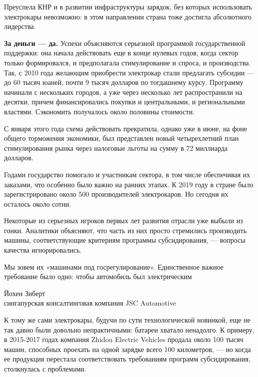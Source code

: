 Преуспела КНР и в развитии инфраструктуры зарядок, без которых использовать электрокары невозможно: в этом направлении страна тоже достигла абсолютного лидерства.

\textbf{За деньги --- да.} Успехи объясняются серьезной программой государственной поддержки: она начала действовать еще в конце нулевых годов, когда сектор только формировался, и предполагала стимулирование и спроса, и производства. Так, с 2010 года желающим приобрести электрокар стали предлагать субсидии — до 60 тысяч юаней, почти 9 тысяч долларов по тогдашнему курсу. Программу начинали с нескольких городов, а уже через несколько лет распространили на десятки, причем финансировались покупки и центральными, и региональными властями. Сэкономить получалось около половины стоимости.

С января этого года схема действовать прекратила, однако уже в июне, на фоне общего торможения экономики, был представлен новый четырехлетний план стимулирования рынка через налоговые льготы на сумму в 72 миллиарда долларов.

Годами государство помогало и участникам сектора, в том числе обеспечивая их заказами, что особенно было важно на ранних этапах. К 2019 году в стране было зарегистрировано около 500 производителей электрокаров. Но сегодня их осталось около сотни.

Некоторые из серьезных игроков первых лет развития отрасли уже выбыли из гонки. Аналитики объясняют, что часть из них просто стремились производить машины, соответствующие критериям программы субсидирования, — вопросы качества игнорировались.

\begin{fancyquotes}
    Мы зовем их «машинами под госрегулирование». Единственное важное требование было одно: чтобы автомобиль был электрическим\\

    \begin{flushright}
        Йохен Зиберт\\
        сингапурская консалтинговая компания JSC Automotive
    \end{flushright}
\end{fancyquotes}

К тому же сами электрокары, будучи по сути технологической новинкой, еще не так давно были довольно непрактичными: батареи хватало ненадолго. К примеру, в 2015-2017 годах компания Zhidou Electric Vehicles продала около 100 тысяч машин, способных проехать на одной зарядке всего 100 километров, — но когда ее продукция перестала соответствовать требованиям программ субсидирования, столкнулась с проблемами.

